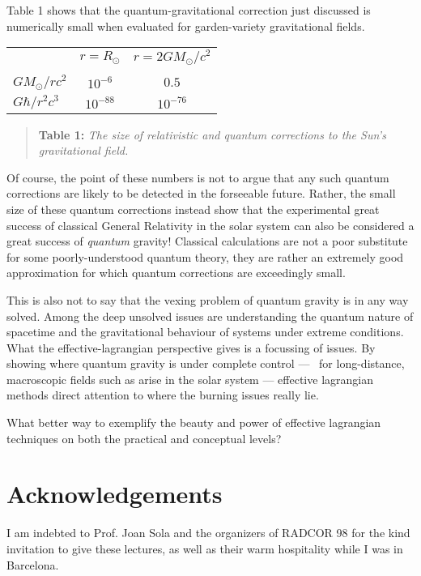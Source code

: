 Table 1 shows that the quantum-gravitational correction just 
discussed is numerically small when evaluated for 
garden-variety gravitational fields. 

\vspace{3mm}
\begin{center}
\begin{tabular}{lcc}
& $r = R_\odot$ & $r = 2 GM_\odot/c^2$ \\
&&\\
$GM_\odot/rc^2$ & $10^{-6}$ & $0.5$ \\
$G\hbar/r^2c^3$ & $10^{-88}$ & $10^{-76}$ 
\end{tabular}
\end{center}

\begin{quote}
{\footnotesize               
{\bf Table 1:} {\sl The size of relativistic and quantum corrections
to the Sun's gravitational field.}}
\end{quote}

Of course, the point of these numbers is not to argue
that any such quantum corrections are likely to be detected
in the forseeable future. Rather, the small size of these
quantum corrections instead show that the experimental 
great success of classical General Relativity in the
solar system can also be considered a great success
of {\it quantum} gravity! Classical calculations are 
not a poor substitute for some poorly-understood
quantum theory, they are rather an extremely good
approximation for which quantum corrections are 
exceedingly small. 

This is also not to say that the vexing problem
of quantum gravity is in any way solved. Among the
deep unsolved issues are understanding the quantum
nature of spacetime and the gravitational behaviour of
systems under extreme conditions. What the
effective-lagrangian perspective gives is a focussing of
issues. By showing where quantum gravity is under complete
control --- \ie\ for long-distance, macroscopic fields such
as arise in the solar system --- effective lagrangian methods
direct attention to where the burning issues really lie. 

What better way to exemplify the beauty and power 
of effective lagrangian
techniques on both the practical and conceptual levels?

\section*{Acknowledgements}
I am indebted to Prof. Joan Sola and the organizers of
RADCOR 98 for the kind invitation to give these lectures, as 
well as their warm hospitality while I was in Barcelona.

